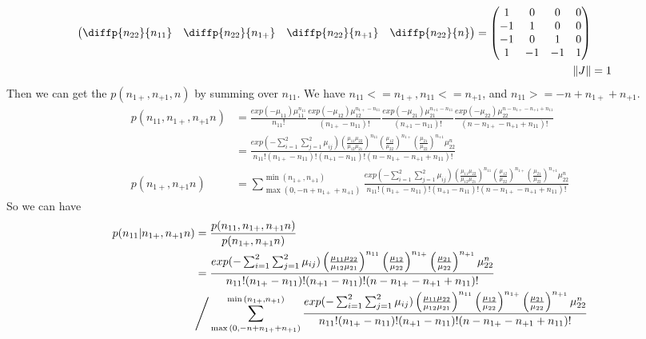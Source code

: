 \documentclass[11pt]{article} %
\begin{document}
\begin{itemize}
\begin{align*}
\begin{pmatrix}
	\diffp{{n_{22}}}{{n_{11}}} & \diffp{{n_{22}}}{{n_{1+}}} & \diffp{{n_{22}}}{{n_{+1}}} & \diffp{{n_{22}}}{{n}} \\
\end{pmatrix}= \begin{pmatrix}
1 & 0 & 0 & 0\\
-1 & 1 & 0 & 0\\
-1 & 0 & 1 & 0\\
1 & -1 & -1 & 1\\
\end{pmatrix}\\
\lVert J \rVert &= 1
\end{align*}
Then we can get the $p(n_{1+}, n_{+1}, n)$ by summing over $n_{11}$. We have $n_{11} <= n_{1+}, n_{11} <= n_{+1}$, and $n_{11} >= -n + n_{1+} + n_{+1}$. 		
\begin{align*}
	p(n_{11}, n_{1+}, n_{+1} n) &= \frac{exp(-\mu_{11})\mu_{11}^{n_{11}} }{n_{11}!} \frac{exp(-\mu_{12})\mu_{12}^{n_{1+} - n_{11}}}{(n_{1+} - n_{11})!} \frac{exp(-\mu_{21})\mu_{21}^{n_{+1} - n_{11}}}{(n_{+1} - n_{11})!} \frac{exp(-\mu_{22})\mu_{22}^{n- n_{1+} - n_{+1} + n_{11}}}{(n- n_{1+} - n_{+1} + n_{11})!}\\
	&= \frac{exp(-\sum_{i=1}^2 \sum_{j=1}^2 \mu_{ij}) \left( \frac{\mu_{11} \mu_{22}}{\mu_{12} \mu_{21}}\right) ^{n_{11}} \left(\frac{\mu_{12}}{\mu_{22}} \right)^{n_{1+}} \left(\frac{\mu_{21}}{\mu_{22}} \right)^{n_{+1}} \mu_{22}^{n}} {n_{11}! (n_{1+} - n_{11})! (n_{+1} - n_{11})! (n- n_{1+} - n_{+1} + n_{11})!}\\
	p(n_{1+}, n_{+1} n) &= \sum_{ \max{(0, -n + n_{1+} + n_{+1})}}^{\min{(n_{1+}, n_{+1})}} \frac{exp(-\sum_{i=1}^2 \sum_{j=1}^2 \mu_{ij}) \left( \frac{\mu_{11} \mu_{22}}{\mu_{12} \mu_{21}}\right) ^{n_{11}} \left(\frac{\mu_{12}}{\mu_{22}} \right)^{n_{1+}} \left(\frac{\mu_{21}}{\mu_{22}} \right)^{n_{+1}} \mu_{22}^{n}} {n_{11}! (n_{1+} - n_{11})! (n_{+1} - n_{11})! (n- n_{1+} - n_{+1} + n_{11})!}
\end{align*}
So we can have 
\begin{align*}
	p(n_{11}|n_{1+}, n_{+1} n) &= \frac{p(n_{11}, n_{1+}, n_{+1} n)}{p(n_{1+}, n_{+1} n)}\\
	 &= \frac{exp(-\sum_{i=1}^2 \sum_{j=1}^2 \mu_{ij}) \left( \frac{\mu_{11} \mu_{22}}{\mu_{12} \mu_{21}}\right) ^{n_{11}} \left(\frac{\mu_{12}}{\mu_{22}} \right)^{n_{1+}} \left(\frac{\mu_{21}}{\mu_{22}} \right)^{n_{+1}} \mu_{22}^{n}} {n_{11}! (n_{1+} - n_{11})! (n_{+1} - n_{11})! (n- n_{1+} - n_{+1} + n_{11})!} \\
	 & \Bigg{/} \sum_{ \max{(0, -n + n_{1+} + n_{+1})}}^{\min{(n_{1+}, n_{+1})}} \frac{exp(-\sum_{i=1}^2 \sum_{j=1}^2 \mu_{ij}) \left( \frac{\mu_{11} \mu_{22}}{\mu_{12} \mu_{21}}\right) ^{n_{11}} \left(\frac{\mu_{12}}{\mu_{22}} \right)^{n_{1+}} \left(\frac{\mu_{21}}{\mu_{22}} \right)^{n_{+1}} \mu_{22}^{n}} {n_{11}! (n_{1+} - n_{11})! (n_{+1} - n_{11})! (n- n_{1+} - n_{+1} + n_{11})!}

\end{align*}
\end{itemize}
\end{document}
